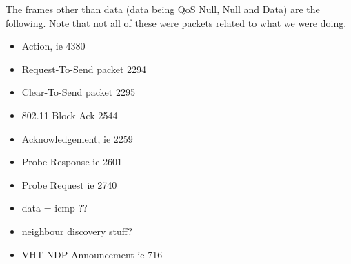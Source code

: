 The frames other than data (data being QoS Null, Null and Data) are the following. Note that not all of these were packets related to what we were doing.
\begin{itemize}
\item Action, ie 4380
\item Request-To-Send packet 2294
\item Clear-To-Send packet 2295
\item 802.11 Block Ack 2544
\item Acknowledgement, ie 2259
\item Probe Response ie 2601
\item Probe Request ie 2740
\item data = icmp ??
\item neighbour discovery stuff?
\item VHT NDP Announcement ie 716
\end{itemize}


%
%
%
